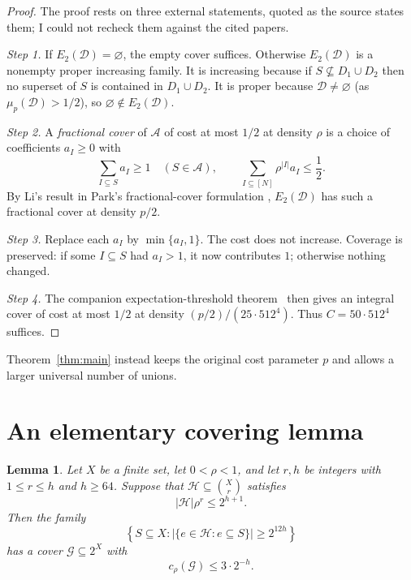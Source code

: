 \documentclass[11pt,letterpaper]{article}
\newtheorem{lemma}[theorem]{Lemma}
\theoremstyle{definition}
\theoremstyle{remark}
\numberwithin{equation}{section}
\begin{document}
\begin{proof}
The proof rests on three external statements, quoted as the source states them; I could not recheck them against the cited papers.

\emph{Step 1.} If $E_2(\mathcal D)=\varnothing$, the empty cover suffices. Otherwise $E_2(\mathcal D)$ is a nonempty proper increasing family. It is increasing because if $S\nsubseteq D_1\cup D_2$ then no superset of $S$ is contained in $D_1\cup D_2$. It is proper because $\mathcal D\ne\varnothing$ (as $\mu_p(\mathcal D)>1/2$), so $\varnothing\notin E_2(\mathcal D)$.

\emph{Step 2.} A \emph{fractional cover} of $\mathcal A$ of cost at most $1/2$ at density $\rho$ is a choice of coefficients $a_I\ge0$ with
\[
\sum_{I\subseteq S}a_I\ge1\quad(S\in\mathcal A),
\qquad
\sum_{I\subseteq[N]}\rho^{|I|}a_I\le\frac12.
\]
By Li's result \cite[Corollary~3.1]{Li26} in Park's fractional-cover formulation \cite[Theorem~3.4]{Park26}, $E_2(\mathcal D)$ has such a fractional cover at density $p/2$.

\emph{Step 3.} Replace each $a_I$ by $\min\{a_I,1\}$. The cost does not increase. Coverage is preserved: if some $I\subseteq S$ had $a_I>1$, it now contributes $1$; otherwise nothing changed.

\emph{Step 4.} The companion expectation-threshold theorem~\cite[Theorem~1.1]{OpenAIThreshold26} then gives an integral cover of cost at most $1/2$ at density $(p/2)/(25\cdot512^4)$. Thus $C=50\cdot512^4$ suffices.
\end{proof}

Theorem~\ref{thm:main} instead keeps the original cost parameter $p$ and allows a larger universal number of unions.

\section{An elementary covering lemma}
\label{sec:covering}

\begin{lemma}\label{lem:covering}
Let \(X\) be a finite set, let \(0<\rho<1\), and let \(r,h\) be integers
with \(1\le r\le h\) and \(h\ge64\). Suppose that
\(\mathcal H\subseteq\binom{X}{r}\) satisfies
\[
|\mathcal H|\rho^r\le2^{h+1}.
\]
Then the family
\[
\left\{S\subseteq X:
  |\{e\in\mathcal H:e\subseteq S\}|\ge2^{12h}\right\}
\]
has a cover \(\mathcal G\subseteq2^X\) with
\[
c_\rho(\mathcal G)\le3\cdot2^{-h}.
\]
\end{lemma}
\end{document}

